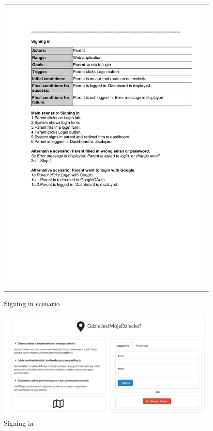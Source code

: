 \documentclass{sprawozdanie-agh}
\begin{document}
		\begin{figure}[H] 
			\centering
			\begin{tabular}{c}
				\includegraphics[width=.80\textwidth]{log_cropped} 
			\end{tabular} 
		\caption{Signing in scenario}
		\end{figure}

		\begin{figure}[H]
			\centering
			\includegraphics[width=.80\textwidth]{signinIn}
			\caption{Signing in}
		\end{figure}
\end{document}
